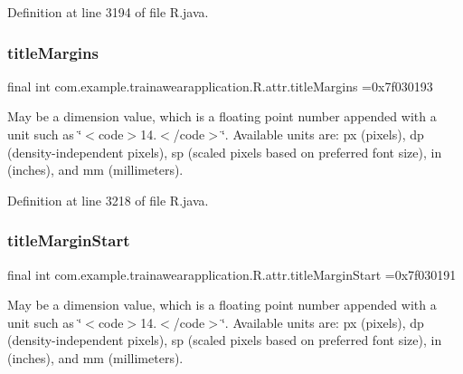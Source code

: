 Definition at line 3194 of file R.\+java.

\mbox{\label{classcom_1_1example_1_1trainawearapplication_1_1_r_1_1attr_af894c6bf018c309ec3144ae34932f5d4}} 
\subsubsection{\texorpdfstring{titleMargins}{titleMargins}}
{\footnotesize\ttfamily final int com.\+example.\+trainawearapplication.\+R.\+attr.\+title\+Margins =0x7f030193\hspace{0.3cm}{\ttfamily [static]}}

May be a dimension value, which is a floating point number appended with a unit such as \char`\"{}$<$code$>$14.\+5sp$<$/code$>$\char`\"{}. Available units are\+: px (pixels), dp (density-\/independent pixels), sp (scaled pixels based on preferred font size), in (inches), and mm (millimeters). 

Definition at line 3218 of file R.\+java.

\mbox{\label{classcom_1_1example_1_1trainawearapplication_1_1_r_1_1attr_a9a63514ed04003c5630659a438d07c2d}} 
\subsubsection{\texorpdfstring{titleMarginStart}{titleMarginStart}}
{\footnotesize\ttfamily final int com.\+example.\+trainawearapplication.\+R.\+attr.\+title\+Margin\+Start =0x7f030191\hspace{0.3cm}{\ttfamily [static]}}

May be a dimension value, which is a floating point number appended with a unit such as \char`\"{}$<$code$>$14.\+5sp$<$/code$>$\char`\"{}. Available units are\+: px (pixels), dp (density-\/independent pixels), sp (scaled pixels based on preferred font size), in (inches), and mm (millimeters). 

